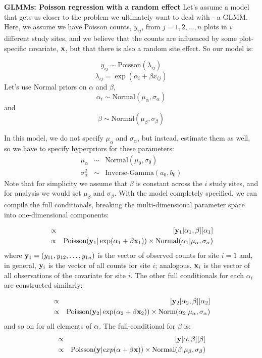 {\flushleft \bf  GLMMs: Poisson regression with a random effect }
Let's assume a model that gets us closer to the problem we ultimately
want to deal with - a GLMM. Here, we assume we have Poisson counts,
$y_{ij}$, from $j=1,2,\ldots,n$ plots in $i$ different study sites,
and we believe that the counts are influenced by some plot-specific
covariate, ${\bf x}$, but that there is also a random site effect. So
our model is:

\[
y_{ij} \sim \mbox{Poisson}(\lambda_{ij})
\]
\[
\lambda_{ij} = \exp (\alpha_i + \beta x_{ij})
\]
Let's use Normal priors on $\alpha$ and $\beta$,  \[
\alpha_i \sim \mbox{Normal} (\mu_{\alpha}, \sigma_{\alpha})
\]
and
\[
\beta \sim \mbox{Normal} (\mu_{\beta}, \sigma_{\beta})
\]

In this model, we do not specify $\mu_{\alpha}$ and $\sigma_{\alpha}$, but instead, estimate them as well, so we have
to specify hyperpriors for these parameters:
\begin{eqnarray*}
\mu_{\alpha}  &\sim &  \mbox{Normal}(\mu_0, \sigma_0)  \\
\sigma_{\alpha}^2 & \sim & \mbox{Inverse-Gamma}(a_0, b_0)
\end{eqnarray*}
Note that for simplicity we assume that $\beta$ is constant across the $i$ study sites, and for analysis we would set $\mu_{\beta}$ and $\sigma_{\beta}$.
With the model completely specified, we can compile the full conditionals,
breaking the multi-dimensional parameter space into one-dimensional
components:

\begin{eqnarray*}
[\alpha_1|\alpha_2,\alpha_3,\ldots,\alpha_i,\beta,{\bf y}_{1}] & \propto &   [{\bf y}_{1}|\alpha_1,\beta]  [\alpha_1] \\
	 & \propto  &   \mbox{Poisson}({\bf y}_{1}| \exp(\alpha_1 + \beta {\bf x}_1)) \times \mbox{Normal}(\alpha_1|\mu_{\alpha} , \sigma_{\alpha})
\end{eqnarray*}
where ${\bf y}_{1} = (y_{11},y_{12}, \ldots, y_{1n})$ is the vector of
observed counts for site $i=1$ and, in general, ${\bf y}_{i}$ is the
vector of all counts for site $i$; analogous, ${\bf x}_{i}$ is the
vector of all observations of the covariate for site $i$. The other full conditionals for
each $\alpha_{i}$ are constructed similarly:

\begin{eqnarray*}
[\alpha_2|\alpha_1,\alpha_3,\ldots,\alpha_i,\beta,{\bf y}_{2}] & \propto&  [{\bf y}_{2}|\alpha_2,\beta]  [\alpha_2] \\
	 & \propto  & \mbox{Poisson}({\bf y}_{2}| \exp(\alpha_2 + \beta {\bf x}_2)) \times \mbox{Norm}(\alpha_2|\mu_{\alpha}, \sigma_{\alpha})
\end{eqnarray*}
and so on for all elements of ${\bf \alpha}$. The full-conditional for $\beta$ is:
\begin{eqnarray*}
[\beta|{\bf \alpha},{\bf y}] &\propto & [{\bf y}|{\bf \alpha},\beta]  [\beta] \\
	 &\propto& \mbox{Poisson}({\bf y}|exp({\bf \alpha} + \beta {\bf x})) \times \mbox{Normal}(\beta|\mu_{\beta}, \sigma_{\beta})
\end{eqnarray*}

